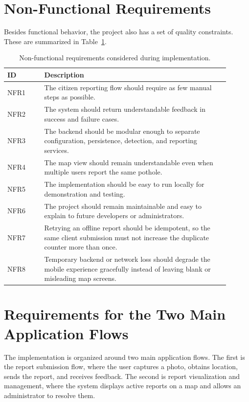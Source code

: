\section{Non-Functional Requirements}

Besides functional behavior, the project also has a set of quality constraints. These are summarized in Table~\ref{tab:nonfunctional_requirements}.

\begin{table}[htbp]
\centering
\begin{tabular}{>{\raggedright\arraybackslash}p{0.15\linewidth} >{\raggedright\arraybackslash}p{0.75\linewidth}}
\toprule
\textbf{ID} & \textbf{Description} \\
\midrule
NFR1 & The citizen reporting flow should require as few manual steps as possible. \\
NFR2 & The system should return understandable feedback in success and failure cases. \\
NFR3 & The backend should be modular enough to separate configuration, persistence, detection, and reporting services. \\
NFR4 & The map view should remain understandable even when multiple users report the same pothole. \\
NFR5 & The implementation should be easy to run locally for demonstration and testing. \\
NFR6 & The project should remain maintainable and easy to explain to future developers or administrators. \\
NFR7 & Retrying an offline report should be idempotent, so the same client submission must not increase the duplicate counter more than once. \\
NFR8 & Temporary backend or network loss should degrade the mobile experience gracefully instead of leaving blank or misleading map screens. \\
\bottomrule
\end{tabular}
\caption{Non-functional requirements considered during implementation.}
\label{tab:nonfunctional_requirements}
\end{table}

\section{Requirements for the Two Main Application Flows}

The implementation is organized around two main application flows. The first is the report submission flow, where the user captures a photo, obtains location, sends the report, and receives feedback. The second is report visualization and management, where the system displays active reports on a map and allows an administrator to resolve them.

